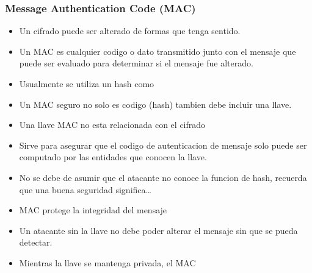 \documentclass[11pt]{article}
\begin{document}
\subsubsection{Message Authentication Code (MAC)}
\label{sec:org33d1b95}
\begin{itemize}
\item Un cifrado puede ser alterado de formas que tenga sentido.
\item Un MAC es cualquier codigo o dato transmitido junto con el mensaje que puede ser evaluado para determinar si el mensaje fue alterado.
\item Usualmente se utiliza un hash como
\item Un MAC seguro no solo es codigo (hash) tambien debe incluir una llave.
\item Una llave MAC no esta relacionada con el cifrado
\item Sirve para asegurar que el codigo de autenticacion de mensaje solo puede ser computado por las entidades que conocen la llave.
\item No se debe de asumir que el atacante no conoce la funcion de hash, recuerda que una buena seguridad significa\ldots{}
\item MAC protege la integridad del mensaje
\item Un atacante sin la llave no debe poder alterar el mensaje sin que se pueda detectar.
\item Mientras la llave se mantenga privada, el MAC
\end{itemize}
\end{document}
